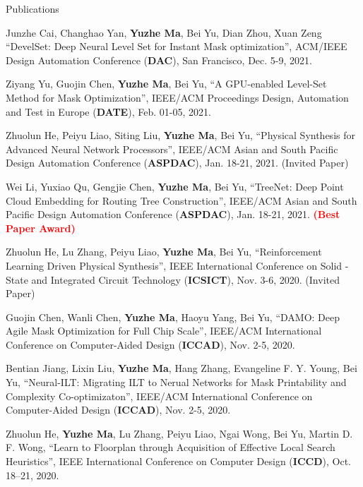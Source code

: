 \begin{rSection}{Publications}
\begin{etaremune}
\item {
    Junzhe Cai, Changhao Yan, \textbf{Yuzhe Ma}, Bei Yu, Dian Zhou, Xuan Zeng
    ``DevelSet: Deep Neural Level Set for Instant Mask optimization'',
    ACM/IEEE Design Automation Conference (\textbf{DAC}), San Francisco, Dec. 5-9, 2021. 
}

\item {
        Ziyang Yu, Guojin Chen, \textbf{Yuzhe Ma}, Bei Yu,
        ``A GPU-enabled Level-Set Method for Mask Optimization'',
        IEEE/ACM Proceedings Design, Automation and Test in Europe (\textbf{DATE}), Feb. 01-05, 2021.
    }

\item {
        Zhuolun He, Peiyu Liao, Siting Liu, \textbf{Yuzhe Ma}, Bei Yu,
        ``Physical Synthesis for Advanced Neural Network Processors'',
         IEEE/ACM Asian and South Pacific Design Automation Conference (\textbf{ASPDAC}), Jan. 18-21, 2021. (Invited Paper)
    }

\item {
        Wei Li, Yuxiao Qu, Gengjie Chen, \textbf{Yuzhe Ma}, Bei Yu,
        ``TreeNet: Deep Point Cloud Embedding for Routing Tree Construction'',
         IEEE/ACM Asian and South Pacific Design Automation Conference (\textbf{ASPDAC}), Jan. 18-21, 2021.
        \textcolor{red}{\textbf{(Best Paper Award)}}
    }

\item{
        Zhuolun He, Lu Zhang, Peiyu Liao, \textbf{Yuzhe Ma}, Bei Yu,
        ``Reinforcement Learning Driven Physical Synthesis'',
        IEEE International Conference on Solid -State and Integrated Circuit Technology (\textbf{ICSICT}), Nov. 3-6, 2020. (Invited Paper)
    }

\item{
        Guojin Chen, Wanli Chen, \textbf{Yuzhe Ma}, Haoyu Yang, Bei Yu,
        ``DAMO: Deep Agile Mask Optimization for Full Chip Scale'',
        IEEE/ACM International Conference on Computer-Aided Design (\textbf{ICCAD}), Nov. 2-5, 2020.
    }

\item{
        Bentian Jiang, Lixin Liu, \textbf{Yuzhe Ma}, Hang Zhang, Evangeline F. Y. Young, Bei Yu,
        ``Neural-ILT: Migrating ILT to Nerual Networks for Mask Printability and Complexity Co-optimizaton'',
        IEEE/ACM International Conference on Computer-Aided Design (\textbf{ICCAD}), Nov. 2-5, 2020.
    }

\item{
        Zhuolun He, \textbf{Yuzhe Ma}, Lu Zhang, Peiyu Liao, Ngai Wong, Bei Yu, Martin D. F. Wong,
        ``Learn to Floorplan through Acquisition of Effective Local Search Heuristics'',
        IEEE International Conference on Computer Design (\textbf{ICCD}), Oct. 18–21, 2020.
    }


\end{etaremune}
\end{rSection}
